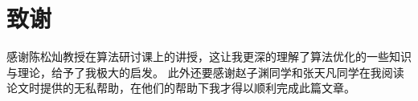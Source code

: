 \chapter{致谢}
感谢陈松灿教授在算法研讨课上的讲授，这让我更深的理解了算法优化的一些知识与理论，给予了我极大的启发。
此外还要感谢赵子渊同学和张天凡同学在我阅读论文时提供的无私帮助，在他们的帮助下我才得以顺利完成此篇文章。 